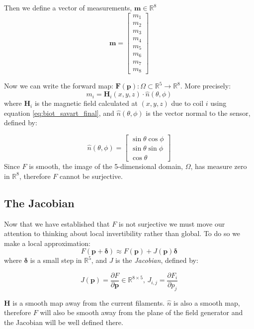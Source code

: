 Then we define a vector of measurements, $\mathbf{m} \in \mathbb{R}^8$
\begin{equation}
  \mathbf{m} = 
  \begin{bmatrix}
    m_1 \\ m_2 \\ m_3 \\ m_4 \\ m_5 \\ m_6 \\ m_7 \\ m_8 
  \end{bmatrix}
\end{equation}

Now we can write the forward map: $\mathbf{F}(\mathbf{p}): \Omega \subset \mathbb{R}^5 \rightarrow \mathbb{R}^8$. More precisely:
\begin{equation}
  m_i = \mathbf{H}_i(x,y,z) \cdot \hat{n}(\theta,\phi) 
  \label{eq:forward}
\end{equation}
where $\mathbf{H}_i$ is the magnetic field calculated at $(x,y,z)$ due to coil $i$ using equation \eqref{eq:biot_savart_final}, and $\hat{n}(\theta,\phi)$ is the vector normal to the sensor, defined by: 

\begin{equation}
  \hat{n}(\theta,\phi) = 
  \begin{bmatrix}
    \sin\theta\cos\phi \\ \sin\theta\sin\phi \\ \cos\theta
  \end{bmatrix}
\end{equation}
Since $F$ is smooth, the image of the 5-dimensional domain, $\Omega$, has measure zero in $\mathbb{R}^8$, therefore $F$ cannot be surjective.

\subsection{The Jacobian}
Now that we have established that $F$ is not surjective we must move our attention to thinking about local invertibility rather than global. To do so we make a local approximation:
\begin{equation}
  F(\mathbf{p} + \mathbf{\delta}) \approx F(\mathbf{p}) + J(\mathbf{p})\mathbf{\delta}
\end{equation}
where $\boldsymbol{\delta}$ is a small step in $\mathbb{R}^5$, and $J$ is the \emph{Jacobian}, defined by:
\begin{definition}[Jacobian]
  $$ J(\mathbf{p}) = \frac{\partial F}{\partial \mathbf{p}} \in \mathbb{R}^{8\times5} \text{, } J_{i,j} = \frac{\partial F_i}{\partial p_j} $$
\end{definition}
$\mathbf{H}$ is a smooth map away from the current filaments. $\hat{n}$ is also a smooth map, therefore $F$ will also be smooth away from the plane of the field generator and the Jacobian will be well defined there.

